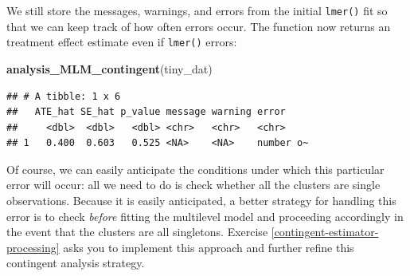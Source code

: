 \documentclass[
]{book}
\newenvironment{Shaded}{\begin{snugshade}}{\end{snugshade}}
\newcommand{\CommentTok}[1]{\textcolor[rgb]{0.56,0.35,0.01}{\textit{#1}}}
\newcommand{\ConstantTok}[1]{\textcolor[rgb]{0.56,0.35,0.01}{#1}}
\newcommand{\DecValTok}[1]{\textcolor[rgb]{0.00,0.00,0.81}{#1}}
\newcommand{\FunctionTok}[1]{\textcolor[rgb]{0.13,0.29,0.53}{\textbf{#1}}}
\newcommand{\NormalTok}[1]{#1}
\newcommand{\OtherTok}[1]{\textcolor[rgb]{0.56,0.35,0.01}{#1}}
\newcommand{\SpecialCharTok}[1]{\textcolor[rgb]{0.81,0.36,0.00}{\textbf{#1}}}
\begin{document}
\begin{Shaded}
\end{Shaded}

We still store the messages, warnings, and errors from the initial \texttt{lmer()} fit so that we can keep track of how often errors occur.
The function now returns an treatment effect estimate even if \texttt{lmer()} errors:

\begin{Shaded}
\begin{Highlighting}[]
\FunctionTok{analysis\_MLM\_contingent}\NormalTok{(tiny\_dat)}
\end{Highlighting}
\end{Shaded}

\begin{verbatim}
## # A tibble: 1 x 6
##   ATE_hat SE_hat p_value message warning error    
##     <dbl>  <dbl>   <dbl> <chr>   <chr>   <chr>    
## 1   0.400  0.603   0.525 <NA>    <NA>    number o~
\end{verbatim}

Of course, we can easily anticipate the conditions under which this particular error will occur: all we need to do is check whether all the clusters are single observations.
Because it is easily anticipated, a better strategy for handling this error is to check \emph{before} fitting the multilevel model and proceeding accordingly in the event that the clusters are all singletons.
Exercise \ref{contingent-estimator-processing} asks you to implement this approach and further refine this contingent analysis strategy.
\end{document}
